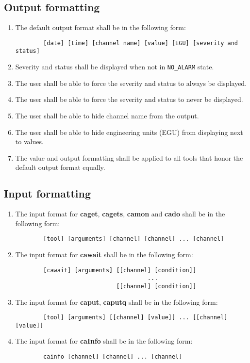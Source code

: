 \documentclass[12pt,a4paper]{article}
\begin{document}
\subsection{Output formatting}
\begin{enumerate}
	\item The default output format shall be in the following form: 
	\begin{verbatim}
		[date] [time] [channel name] [value] [EGU] [severity and status]
	\end{verbatim}
	\item Severity and status shall be displayed when not in \texttt{NO\_ALARM} state.
	\item The user shall be able to force the severity and status to always be displayed.
	\item The user shall be able to force the severity and status to never be displayed.
	\item The user shall be able to hide channel name from the output.
	\item The user shall be able to hide engineering units (EGU) from displaying next to values.
	\item The value and output formatting shall be applied to all tools that honor the default output format equally.
\end{enumerate}

\subsection{Input formatting}
\begin{enumerate}
	\item The input format for \textbf{caget}, \textbf{cagets}, \textbf{camon} and \textbf{cado} shall be in the following form:
	\begin{verbatim}
		[tool] [arguments] [channel] [channel] ... [channel]
	\end{verbatim}	
	\item The input format for \textbf{cawait} shall be in the following form:
	\begin{verbatim}
		[cawait] [arguments] [[channel] [condition]] 
		                              ... 
		                     [[channel] [condition]]
	\end{verbatim}
	\item The input format for \textbf{caput}, \textbf{caputq} shall be in the following form:
	\begin{verbatim}
		[tool] [arguments] [[channel] [value]] ... [[channel] [value]]
	\end{verbatim}
	\item The input format for \textbf{caInfo} shall be in the following form:
	\begin{verbatim}
		cainfo [channel] [channel] ... [channel]
	\end{verbatim}
\end{enumerate}



\end{document}
